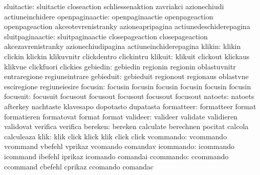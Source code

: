                sluitactie: sluitactie                closeaction
                           schliessenaktion          zavriakci
                           azionechiudi              actiuneinchidere
          openpaginaactie: openpaginaactie           openpageaction
                           openpageaction            akceotevrenistranky
                           azioneapripagina          actiunedeschiderepagina %
         sluitpaginaactie: sluitpaginaactie          closepageaction
                           closepageaction           akcezavrenistranky
                           azionechiudipagina        actiuneinchiderepagina %
                   klikin: klikin                    clickin
                           klickin                   klikuvnitr
                           clickdentro               clickintru
                  klikuit: klikuit                   clickout
                           klickaus                  klikvne
                           clickfuori                clickies
                 gebiedin: gebiedin                  regionin
                           regionin                  oblastuvnitr
                           entraregione              regiuneintrare
                gebieduit: gebieduit                 regionout
                           regionaus                 oblastvne
                           esciregione               regiuneiesire
                  focusin: focusin                   focusin
                           focusin                   focusin
                           focusin                   focusin
                 focusuit: focusuit                  focusout
                           focusout                  focusout
                           focusout                  focusout
                  natoets: natoets                   afterkey
                           nachtaste                 klavesapo
                           dopotasto                 dupatasta
               formatteer: formatteer                format
                           formatieren               formatovat
                           format                    format %
                 valideer: valideer                  validate
                           validieren                validovat
                           verifica                  verifica
                  bereken: bereken                   calculate
                           berechnen                 pocitat
                           calcola                   calculeaza
                     klik: klik                      click
                           klick                     klik
                           click                     click
                vcommando: vcommando                 vcommand
                           vbefehl                   vprikaz
                           vcomando                  comandav
                icommando: icommando                 icommand
                           ibefehl                   iprikaz
                           icomando                  comandai
                ccommando: ccommando                 ccommand
                           cbefehl                   cprikaz
                           ccomando                  comandac

